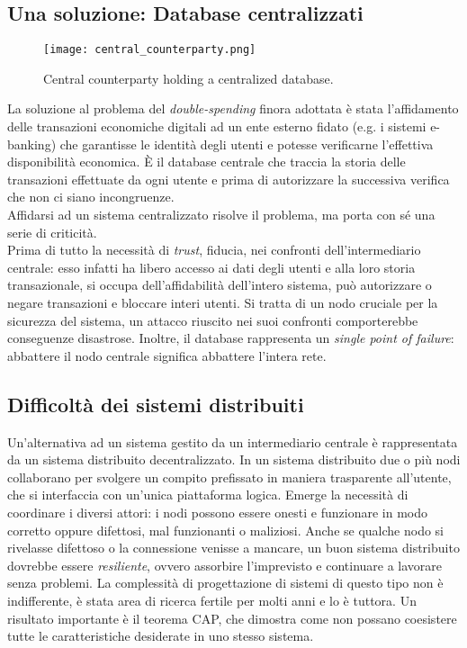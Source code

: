 	\subsection{Una soluzione: Database centralizzati}
		\begin{figure}[ht]
			\centering
			\texttt{[image: central\_counterparty.png]}
			\caption[Central counterparty holding a centralized database]{Central counterparty holding a centralized database. \cite{understanding_bitcoin}}
			\label{fig:central_counterparty_img}
		\end{figure}
		La soluzione al problema del \emph{double-spending} finora adottata è stata l'affidamento delle transazioni economiche digitali ad un ente esterno fidato (e.g. i sistemi e-banking) che garantisse le identità degli utenti e potesse verificarne l'effettiva disponibilità economica. È il database centrale che traccia la storia delle transazioni effettuate da ogni utente e prima di autorizzare la successiva verifica che non ci siano incongruenze. \\
		Affidarsi ad un sistema centralizzato risolve il problema, ma porta con sé una serie di criticità. \\
		Prima di tutto la necessità di \emph{trust}, fiducia, nei confronti dell'intermediario centrale: esso infatti ha libero accesso ai dati degli utenti e alla loro storia transazionale, si occupa dell'affidabilità dell'intero sistema, può autorizzare o negare transazioni e bloccare interi utenti. Si tratta di un nodo cruciale per la sicurezza del sistema, un attacco riuscito nei suoi confronti comporterebbe conseguenze disastrose. Inoltre, il database rappresenta un \emph{single point of failure}: abbattere il nodo centrale significa abbattere l'intera rete.

	\subsection{Difficoltà dei sistemi distribuiti}
		Un'alternativa ad un sistema gestito da un intermediario centrale è rappresentata da un sistema distribuito decentralizzato. In un sistema distribuito due o più nodi collaborano per svolgere un compito prefissato in maniera trasparente all'utente, che si interfaccia con un'unica piattaforma logica. Emerge la necessità di coordinare i diversi attori: i nodi possono essere onesti e funzionare in modo corretto oppure difettosi, mal funzionanti o maliziosi. Anche se qualche nodo si rivelasse difettoso o la connessione venisse a mancare, un buon sistema distribuito dovrebbe essere \emph{resiliente}, ovvero assorbire l'imprevisto e continuare a lavorare senza problemi. La complessità di progettazione di sistemi di questo tipo non è indifferente, è stata area di ricerca fertile per molti anni e lo è tuttora. Un risultato importante è il teorema CAP, che dimostra come non possano coesistere tutte le caratteristiche desiderate in uno stesso sistema.

